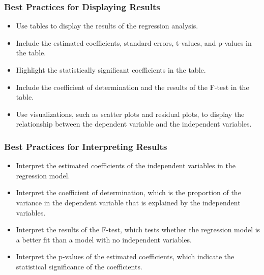 \documentclass[serif, 9pt, aspectratio=32]{beamer}
\begin{document}
\begin{frame}
    \frametitle{Best Practices for Displaying Results}
    \begin{itemize}
        \setlength{\itemsep}{2em}
        \item Use tables to display the results of the regression analysis.
        \item Include the estimated coefficients, standard errors, t-values, and p-values in the table.
        \item Highlight the statistically significant coefficients in the table.
        \item Include the coefficient of determination and the results of the F-test in the table.
        \item Use visualizations, such as scatter plots and residual plots, to display the relationship between the dependent variable and the independent variables.
    \end{itemize}
\end{frame}

\begin{frame}
    \frametitle{Best Practices for Interpreting Results}
    \begin{itemize}
        \setlength{\itemsep}{2em}
        \item Interpret the estimated coefficients of the independent variables in the regression model.
        \item Interpret the coefficient of determination, which is the proportion of the variance in the dependent variable that is explained by the independent variables.
        \item Interpret the results of the F-test, which tests whether the regression model is a better fit than a model with no independent variables.
        \item Interpret the p-values of the estimated coefficients, which indicate the statistical significance of the coefficients.
    \end{itemize}
\end{frame}


\end{document}
